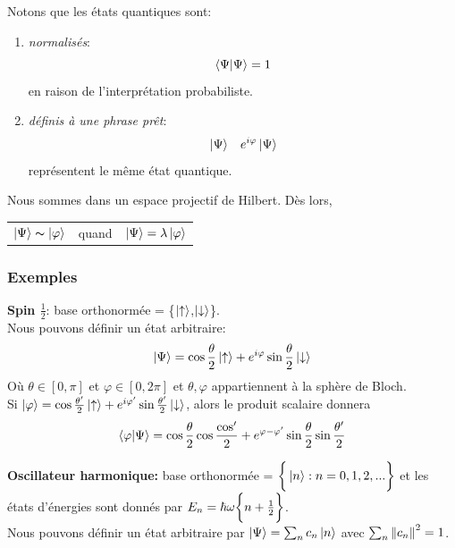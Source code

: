 \documentclass[../notesdecours.tex]{subfiles}
\begin{document}
Notons que les états quantiques sont:
\begin{enumerate}
\item \emph{normalisés}:
\begin{equation}
\braket{\Psi|\Psi} = 1
\end{equation}
en raison de l'interprétation probabiliste.
\item \emph{définis à une phrase prêt}:
\begin{align}
&\ket{\Psi} 	&e^{i\varphi}\ket{\Psi}
\end{align}
représentent le même état quantique.
\end{enumerate}
Nous sommes dans un espace projectif de Hilbert. Dès lors,

\begin{center}
\begin{tabular}{ c c c } 
$\ket{\Psi} \thicksim \ket{\varphi}$ & quand & $\ket{\Psi} = \lambda\ket{\varphi}$  
\end{tabular}
\end{center}

\subsubsection{Exemples}
\textbf{Spin $\frac{1}{2}$}: base orthonormée = \bigg\{$\ket{\uparrow}$,$\ket{\downarrow}$\bigg\}.\\

Nous pouvons définir un état arbitraire:
\begin{equation}
\ket{\Psi} = \cos\frac{\theta}{2} \ket{\uparrow}+e^{i\varphi}\sin\frac{\theta}{2}\ket{\downarrow}
\end{equation}
Où $\theta\in[0,\pi]$ et $\varphi \in [0,2\pi]$ et $\theta,\varphi$ appartiennent à la sphère de Bloch.\\

Si $\ket{\varphi} = \cos\frac{\theta'}{2}\ket{\uparrow}+e^{i\varphi'}\sin\frac{\theta'}{2}\ket{\downarrow}$, alors le produit scalaire donnera
\begin{equation}
\braket{\varphi|\Psi} = \cos\frac{\theta}{2}\cos\frac{\cos'}{2}+e^{\varphi-\varphi'}\sin\frac{\theta}{2}\sin\frac{\theta'}{2}
\end{equation}

\textbf{Oscillateur harmonique:} base orthonormée = $\bigg\{\ket{n} : n=0,1,2,...\bigg\}$ et les états d'énergies sont donnés par $E_n = \hbar\omega\bigg\{n+\frac{1}{2}\bigg\}$.\\

Nous pouvons définir un état arbitraire par $\ket{\Psi} = \sum_n c_n \ket{n}$ avec $\sum_n \norm{c_n}^2 = 1$.
\end{document}
